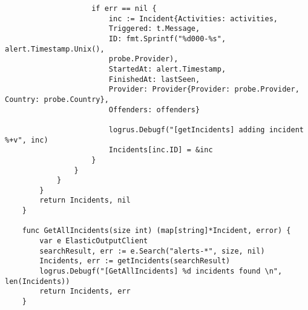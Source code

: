 \begin{verbatim}
                    if err == nil {
                        inc := Incident{Activities: activities, 
                        Triggered: t.Message,
                        ID: fmt.Sprintf("%d000-%s", alert.Timestamp.Unix(), 
                        probe.Provider),
                        StartedAt: alert.Timestamp,
                        FinishedAt: lastSeen, 
                        Provider: Provider{Provider: probe.Provider, Country: probe.Country},
                        Offenders: offenders}

                        logrus.Debugf("[getIncidents] adding incident %+v", inc)
                        Incidents[inc.ID] = &inc
                    }
                }
            }
        }
        return Incidents, nil
    }
    
    func GetAllIncidents(size int) (map[string]*Incident, error) {
        var e ElasticOutputClient
        searchResult, err := e.Search("alerts-*", size, nil)
        Incidents, err := getIncidents(searchResult)
        logrus.Debugf("[GetAllIncidents] %d incidents found \n", len(Incidents))
        return Incidents, err
    }
    

\end{verbatim}
    

